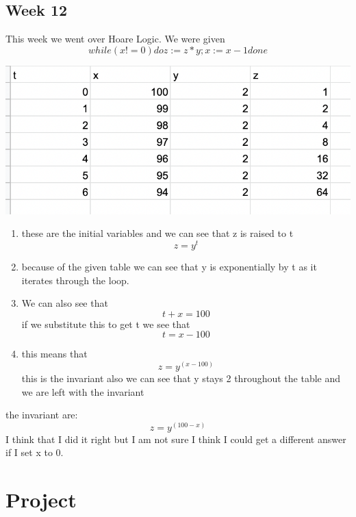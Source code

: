 \documentclass{article}
\theoremstyle{theorem}
\theoremstyle{definition}
\theoremstyle{remark}
\begin{document}
\subsection{Week 12}
This week we went over Hoare Logic. We were given \[ while (x!=0) do z:=z*y;  x:= x-1 done
 \]
 \begin{center}
 \includegraphics[scale=0.6]{hw12.jpg}
 \end{center}
 \begin{enumerate}
  \item  these are the initial variables and we can see that z is raised to t \[ z=y^t\]
   \item because of the given table we can see that y is exponentially by t as it iterates through the loop.
    \item We can also see that \[ t + x =100\] if we substitute this to get t we see that \[ t = x-100\]
    \item this means that \[ z=y^(x-100) \] this is the invariant also we can see that y stays 2 throughout the table and we are left with the invariant

\end{enumerate}
 
  the invariant are: \[ z =  y^(100-x) \]
I think that I did it right but I am not sure I think I could get a different answer if I set x to 0.
\section{Project}\label{Project}
\end{document}
